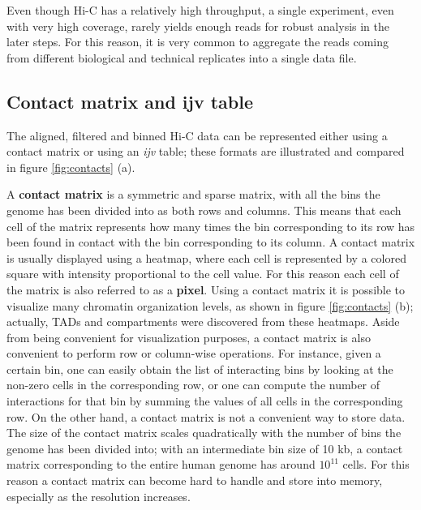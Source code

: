 Even though Hi-C has a relatively high throughput, a single experiment, even with very high coverage, rarely yields enough reads for robust analysis in the later steps. For this reason, it is very common to aggregate the reads coming from different biological and technical replicates into a single data file.

\subsection{Contact matrix and ijv table}

The aligned, filtered and binned Hi-C data can be represented either using a contact matrix or using an \emph{ijv} table; these formats are illustrated and compared in figure \ref{fig:contacts} (a).

A \textbf{contact matrix} is a symmetric and sparse matrix, with all the bins the genome has been divided into as both rows and columns. This means that each cell of the matrix represents how many times the bin corresponding to its row has been found in contact with the bin corresponding to its column. A contact matrix is usually displayed using a heatmap, where each cell is represented by a colored square with intensity proportional to the cell value. For this reason each cell of the matrix is also referred to as a \textbf{pixel}. Using a contact matrix it is possible to visualize many chromatin organization levels, as shown in figure \ref{fig:contacts} (b); actually, TADs and compartments were discovered from these heatmaps. Aside from being convenient for visualization purposes, a contact matrix is also convenient to perform row or column-wise operations. For instance, given a certain bin, one can easily obtain the list of interacting bins by looking at the non-zero cells in the corresponding row, or one can compute the number of interactions for that bin by summing the values of all cells in the corresponding row. On the other hand, a contact matrix is not a convenient way to store data. The size of the contact matrix scales quadratically with the number of bins the genome has been divided into; with an intermediate bin size of 10 kb, a contact matrix corresponding to the entire human genome has around $10^{11}$ cells. For this reason a contact matrix can become hard to handle and store into memory, especially as the resolution increases.

